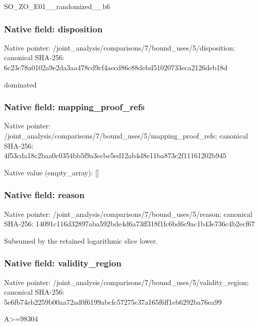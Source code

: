\documentclass[10pt,a4paper]{article}
\begin{document}
\begingroup\raggedright\sloppy SO\_\allowbreak{}ZO\_\allowbreak{}E01\_\allowbreak{}\_\allowbreak{}randomized\_\allowbreak{}\_\allowbreak{}b6\par\endgroup

\subsubsection{Native field: disposition}
Native pointer: /joint\_\allowbreak{}analysis/comparisons/7/bound\_\allowbreak{}uses/5/disposition; canonical SHA-256: 6c23c78a0102a9e2da3aa478cd9cf4aecd86c88debd51020733eca2126deb18d

\begingroup\raggedright\sloppy dominated\par\endgroup

\subsubsection{Native field: mapping\_\allowbreak{}proof\_\allowbreak{}refs}
Native pointer: /joint\_\allowbreak{}analysis/comparisons/7/bound\_\allowbreak{}uses/5/mapping\_\allowbreak{}proof\_\allowbreak{}refs; canonical SHA-256: 4f53cda18c2baa0c0354bb5f9a3ecbe5ed12ab4d8e11ba873c2f11161202b945

Native value (empty\_\allowbreak{}array): []

\subsubsection{Native field: reason}
Native pointer: /joint\_\allowbreak{}analysis/comparisons/7/bound\_\allowbreak{}uses/5/reason; canonical SHA-256: 14091c116d32897aba592bde4d6a73ff318f1fc6bd6c9ac1b43e736c4b2ecf67

\begingroup\raggedright\sloppy Subsumed by the retained logarithmic slice lower.\par\endgroup

\subsubsection{Native field: validity\_\allowbreak{}region}
Native pointer: /joint\_\allowbreak{}analysis/comparisons/7/bound\_\allowbreak{}uses/5/validity\_\allowbreak{}region; canonical SHA-256: 5e6fb74eb2259b00aa72ad0f6199abcfc57275c37a165f6ff1eb6292ba76ea99

\begingroup\raggedright\sloppy A>=\allowbreak{}98304\par\endgroup
\end{document}
